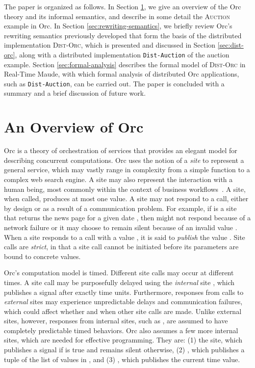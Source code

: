 \documentclass{eptcs}
\begin{document}
The paper is organized as follows. In Section \ref{sec:orc}, we give an overview of the Orc theory and its informal semantics, and describe in some detail the \textsc{Auction} example in Orc. In Section \ref{sec:rewriting-semantics}, we briefly review Orc's rewriting semantics previously developed that form the basis of the distributed implementation \textsc{Dist-Orc}, which is presented and discussed in Section \ref{sec:dist-orc}, along with a distributed implementation \texttt{Dist-Auction} of the auction example. Section \ref{sec:formal-analysis} describes the formal model of \textsc{Dist-Orc} in Real-Time Maude, with which formal analysis of distributed Orc applications, such as \texttt{Dist-Auction}, can be carried out. The paper is concluded with a summary and a brief discussion of future work.


\section{An Overview of Orc} \label{sec:orc}

Orc is a theory of orchestration of services that provides an elegant model for describing concurrent computations. Orc uses the notion of a \emph{site} to represent a general service, which may vastly range in complexity from a simple function to a complex web search engine. A site may also represent the interaction with a human being, most commonly within the context of business workflows~\cite{Aalstetal2003}. A site, when called, produces at most one value. A site may not respond to a call, either by design or as a result of a communication problem. For example, if  is a site that returns the news page for a given date , then  might not respond because of a network failure or it may choose to remain silent because of an invalid value . When a site responds to a call with a value , it is said to \emph{publish} the value . Site calls are \emph{strict}, in that a site 
call cannot be initiated before its parameters are bound to concrete values.

Orc's computation model is timed. Different site calls may occur at different times. A site call may be purposefully delayed using the \emph{internal} site , which publishes a signal after exactly  time units. Furthermore, responses from calls to \emph{external} sites may experience unpredictable delays and communication failures, which could affect whether and when other site calls are made. Unlike external sites, however, responses from internal sites, such as , are assumed to have completely predictable timed behaviors. Orc also assumes a few more internal sites, which are needed for effective programming. They are: (1) the  site, which publishes a signal if  is true and remains silent otherwise, (2) , which publishes a tuple of the list of values in , and (3) , which publishes the current time value. 
\end{document}
